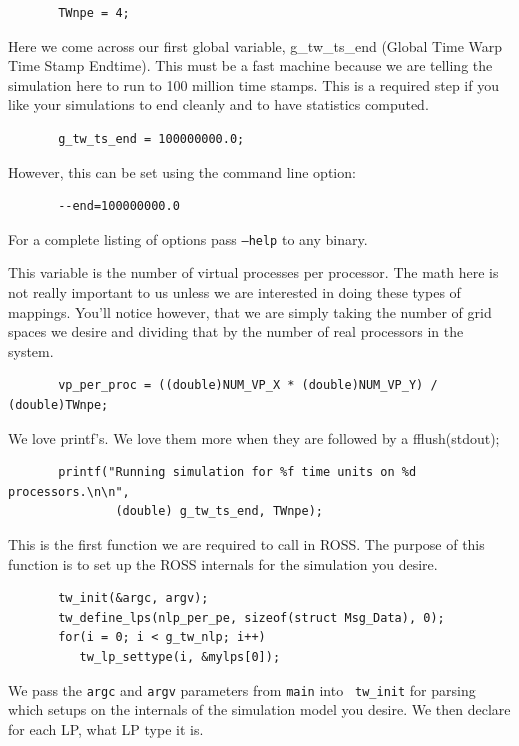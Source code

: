 \documentclass[12pt]{article}
\begin{document}
\begin{verbatim}
       TWnpe = 4;
\end{verbatim}

Here we come across our first global variable, g\_tw\_ts\_end (Global
Time Warp Time Stamp Endtime).  This must be a fast machine because we
are telling the simulation here to run to 100 million time stamps.
This is a required step if you like your simulations to end cleanly
and to have statistics computed.

\begin{verbatim}
       g_tw_ts_end = 100000000.0;
\end{verbatim}

However, this can be set using the command line option:

\begin{verbatim}
       --end=100000000.0
\end{verbatim}

For a complete listing of options pass {\tt --help} to any binary.

This variable is the number of virtual processes per processor. The math here
is not really important to us unless we are interested in doing these types of
mappings.  You'll notice however, that we are simply taking the number of grid
spaces we desire and dividing that by the number of real processors in the
system.
 
\begin{verbatim}
       vp_per_proc = ((double)NUM_VP_X * (double)NUM_VP_Y) / (double)TWnpe;
\end{verbatim}

We love printf's.  We love them more when they are followed by a fflush(stdout);
 
\begin{verbatim}
       printf("Running simulation for %f time units on %d processors.\n\n", 
               (double) g_tw_ts_end, TWnpe);
\end{verbatim}
 
This is the first function we are required to call in ROSS.  The
purpose of this function is to set up the ROSS internals for the
simulation you desire.  

\begin{verbatim}
       tw_init(&argc, argv);
       tw_define_lps(nlp_per_pe, sizeof(struct Msg_Data), 0);
       for(i = 0; i < g_tw_nlp; i++)
          tw_lp_settype(i, &mylps[0]);
\end{verbatim}
 
We pass the {\tt argc} and {\tt argv} parameters from {\tt main} into {\tt
  tw\_init} for parsing which setups on the internals of the simulation model
you desire. We then declare for each LP, what LP type it is.
\end{document}
